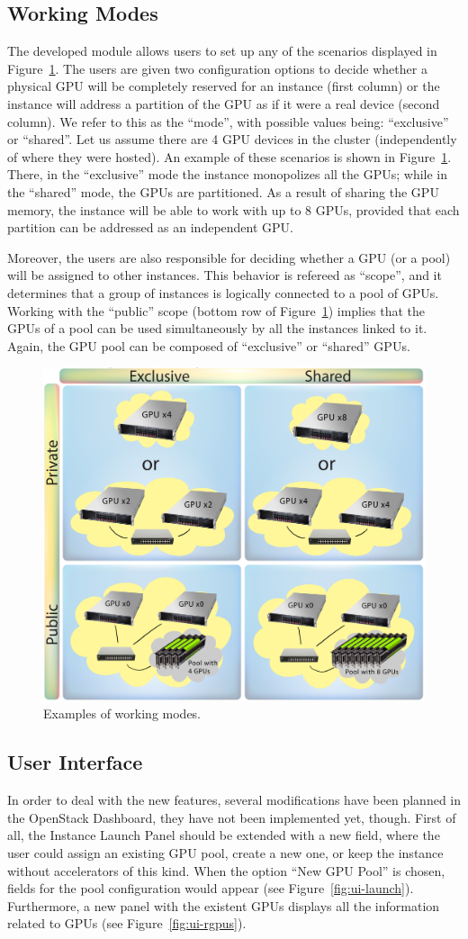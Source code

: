 \documentclass[a4paper,twoside]{article}
\begin{document}
\subsection{Working Modes}
The developed module allows users to set up any of the scenarios displayed in Figure~\ref{fig2}. 
The users are given two configuration options to decide whether a physical GPU will be completely reserved for an instance (first column) or the instance will address a partition of the GPU as if it were a real device (second column).
We refer to this as the ``mode'', with possible values being: ``exclusive'' or ``shared''. 
Let us assume there are 4 GPU devices in the cluster (independently of where they were hosted). 
An example of these scenarios is shown in Figure~\ref{fig2}.
There, in the ``exclusive'' mode the instance monopolizes all the GPUs; while in the ``shared'' mode, the GPUs are partitioned. 
As a result of sharing the GPU memory, the instance will be able to work with up to 8 GPUs, provided that each partition can be addressed as an independent GPU.

Moreover, the users are also responsible for deciding whether a GPU (or a pool) will be assigned to other instances. 
This behavior is refereed as ``scope'', and it determines that a group of instances is logically connected to a pool of GPUs.
Working with the ``public'' scope (bottom row of Figure~\ref{fig2}) implies that the GPUs of a pool can be used simultaneously by all the instances linked to it.
Again, the GPU pool can be composed of ``exclusive'' or ``shared'' GPUs.

\begin{figure}[htb]
  \centering
  \includegraphics[width=.5\textwidth]{images/workingmodes.jpg}
  \caption{Examples of working modes.}
  \label{fig2}
\end{figure}

\subsection{User Interface}
In order to deal with the new features, several modifications have been planned in the OpenStack Dashboard, they have not been implemented yet, though.
First of all, the Instance Launch Panel should be extended with a new field, where the user could assign an existing GPU pool, create a new one, or keep the instance without accelerators of this kind.
When the option ``New GPU Pool'' is chosen, fields for the pool configuration would appear (see Figure~\ref{fig:ui-launch}).
Furthermore, a new panel with the existent GPUs displays all the information related to GPUs (see Figure~\ref{fig:ui-rgpus}).
\end{document}

